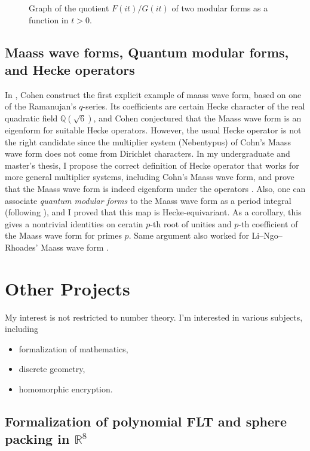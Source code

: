 \documentclass[12pt]{article}
\begin{document}
\begin{figure}[h]
    \centering
    
    \caption{Graph of the quotient $F(it)/G(it)$ of two modular forms as a function in $t > 0$.}
    \label{fig:d8graph}
\end{figure}
\subsection*{Maass wave forms, Quantum modular forms, and Hecke operators}

In \cite{cohen1988q}, Cohen construct the first explicit example of maass wave form, based on one of the Ramanujan's $q$-series.
Its coefficients are certain Hecke character of the real quadratic field $\mathbb{Q}(\sqrt{6})$, and Cohen conjectured that the Maass wave form is an eigenform for suitable Hecke operators.
However, the usual Hecke operator is not the right candidate since the multiplier system (Nebentypus) of Cohn's Maass wave form does not come from Dirichlet characters.
In my undergraduate and master's thesis, I propose the correct definition of Hecke operator that works for more general multiplier systems, including Cohn's Maass wave form, and prove that the Maass wave form is indeed eigenform under the operators \cite{lee2018quantum,lee2019maass}.
Also, one can associate \emph{quantum modular forms} to the Maass wave form as a period integral (following \cite{lewis2001period,zagier2010quantum}), and I proved that this map is Hecke-equivariant.
As a corollary, this gives a nontrivial identities on ceratin $p$-th root of unities and $p$-th coefficient of the Maass wave form for primes $p$.
Same argument also worked for Li--Ngo--Rhoades' Maass wave form \cite{li2013renormalization}.


\section*{Other Projects}

My interest is not restricted to number theory. I'm interested in various subjects, including
\begin{itemize}
    \item formalization of mathematics,
    \item discrete geometry,
    \item homomorphic encryption.
\end{itemize}




\subsection*{Formalization of polynomial FLT and sphere packing in $\mathbb{R}^{8}$}
\end{document}
